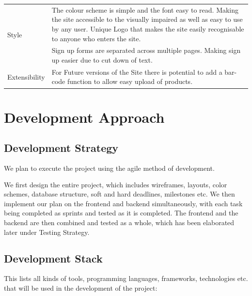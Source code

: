 \documentclass[12pt]{article}
\begin{document}
\begin{table}[ht!]
\begin{tabular}{|p{2.5cm}|p{12cm}|}
        \hline
        \multirow{2}{2.5cm}{Style} & The colour scheme is simple and the font
        easy to read. Making the site accessible to the visually impaired as
        well as easy to use by any user. Unique Logo that makes the site easily
        recognisable to anyone who enters the site.\\
        \cline{2-2}
        & Sign up forms are separated across multiple pages. Making sign up
        easier due to cut down of text.\\
        \hline
        Extensibility & For Future versions of the Site there is potential to
        add a bar-code function to allow easy upload of products.\\
        \hline

    \end{tabular}
    \label{tab:nfr}
\end{table}

\section{Development Approach}

\subsection{Development Strategy}

We plan to execute the project using the agile method of development.

We first design the entire project, which includes wireframes, layouts, color schemes, database structure, soft and hard deadlines, milestones etc. We then implement our plan on the frontend and backend simultaneously, with each task being completed as sprints and tested as it is completed. The frontend and the backend are then combined and tested as a whole, which has been elaborated later under Testing Strategy.

\subsection{Development Stack}


This lists all kinds of tools, programming languages, frameworks, technologies etc. that will be used in the development of the project:
\end{document}
